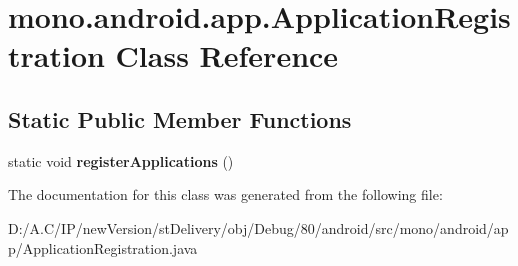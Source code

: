 \hypertarget{classmono_1_1android_1_1app_1_1_application_registration}{}\section{mono.\+android.\+app.\+Application\+Registration Class Reference}
\label{classmono_1_1android_1_1app_1_1_application_registration}
\subsection*{Static Public Member Functions}
\begin{DoxyCompactItemize}
\item 
\mbox{\label{classmono_1_1android_1_1app_1_1_application_registration_aa4d14d9d7a2c1c57a8ddf959fbb71e47}} 
static void {\bfseries register\+Applications} ()
\end{DoxyCompactItemize}


The documentation for this class was generated from the following file\+:\begin{DoxyCompactItemize}
\item 
D\+:/\+A.\+C/\+I\+P/new\+Version/st\+Delivery/obj/\+Debug/80/android/src/mono/android/app/Application\+Registration.\+java\end{DoxyCompactItemize}
